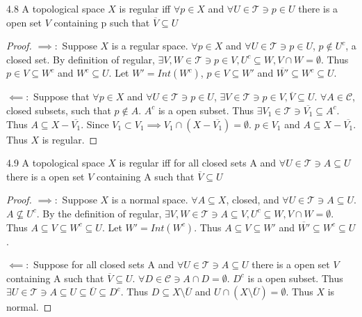 \documentclass{article}
\newcommand*{\T}{\mathcal{T}}
\begin{document}
\begin{claim}{4.8}\label{Claim 4.8.}
    A topological space $X$ is regular iff $\forall p \in X$ and $\forall U \in \T \ni p \in U$ there is a open set $V$ containing p such that $\overline{V} \subseteq U$      
\end{claim}
\begin{proof}
    $\implies:$ Suppose $X$ is a regular space. $\forall p \in X$ and $\forall U \in \T \ni p \in U$, $p \not \in U^c$, a closed set. By definition of regular, $\exists V, W \in \T \ni p \in V, U^c \subseteq W, V \cap W = \emptyset$. Thus $p \in V \subseteq W^c$ and $W^c \subseteq U$. Let $W' = Int(W^c)$, $p \in V \subseteq W'$ and $\overline{W'} \subseteq W^c \subseteq U$.    
    
    
    $\impliedby:$ Suppose that $\forall p \in X$ and $\forall U \in \T \ni p \in U$, $\exists V \in \T \ni p \in V, \overline{V} \subseteq U$. $\forall A \in \mathcal{C}$, closed subsets, such that $p \not \in A$. $A^c$ is a open subset. Thus $\exists V_1 \in \T \ni \overline{V_1} \subseteq A^c$. Thus $A \subseteq X -\overline{V_1}$. Since $V_1 \subset V_1 \implies V_1 \cap (X - \overline{V_1}) = \emptyset$. $p \in V_1$ and $A \subseteq X- \overline{V_1}$. Thus $X$ is regular.                
\end{proof}

\bigskip

\begin{claim}{4.9}\label{Claim 4.9.}
    A topological space $X$ is regular iff for all closed sets A and $\forall U \in \T \ni A \subseteq U$ there is a open set $V$ containing A such that $\overline{V} \subseteq U$      
\end{claim}
\begin{proof}
    $\implies:$ Suppose $X$ is a normal space. $\forall A \subseteq X$, closed, and $\forall U \in \T \ni A \subseteq U$. $A \not \subseteq U^c$. By the definition of regular, $\exists V, W \in \T \ni A \subseteq V, U^c \subseteq W, V \cap W = \emptyset$. Thus $A \subseteq V \subseteq W^c \subseteq U$. Let $W' = Int(W^c)$. Thus $A \subseteq V \subseteq W'$ and $\overline{W'} \subseteq W^c \subseteq U$. 
    
    $\impliedby: $ Suppose for all closed sets A and $\forall U \in \T \ni A \subseteq U$ there is a open set $V$ containing A such that $\overline{V} \subseteq U$. $\forall D \in \mathcal{C} \ni A \cap D = \emptyset$. $D^c$ is a open subset. Thus $\exists U \in \T \ni A \subseteq U \subseteq \overline{U} \subseteq D^c$. Thus $D \subseteq X \setminus \overline{U}$ and $U \cap (X \setminus \overline{U}) = \emptyset$. Thus $X$ is normal.       
\end{proof}
\end{document}
